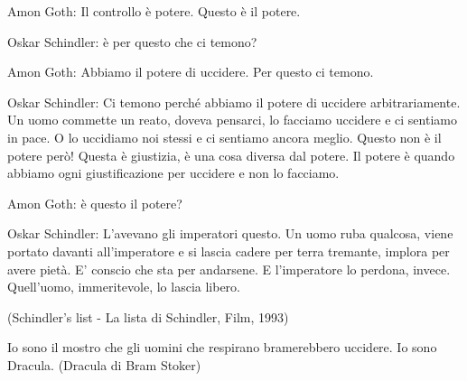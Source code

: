 \bigskip

\begin{changemargin}{0cm}{0.5cm}\begin{enfasi}{

			Amon Goth: Il controllo è potere. Questo è il potere.

			Oskar Schindler: è per questo che ci temono?

			Amon Goth: Abbiamo il potere di uccidere. Per questo ci temono.

			Oskar Schindler: Ci temono perché abbiamo il potere di uccidere arbitrariamente. Un uomo commette un reato, doveva pensarci, lo facciamo uccidere e ci sentiamo in pace. O lo uccidiamo noi stessi e ci sentiamo ancora meglio. Questo non è il potere però! Questa è giustizia, è una cosa diversa dal potere. Il potere è quando abbiamo ogni giustificazione per uccidere e non lo facciamo.

			Amon Goth: è questo il potere?

			Oskar Schindler: L'avevano gli imperatori questo. Un uomo ruba qualcosa, viene portato davanti all'imperatore e si lascia cadere per terra tremante, implora per avere pietà. E' conscio che sta per andarsene. E l'imperatore lo perdona, invece. Quell'uomo, immeritevole, lo lascia libero.

			(Schindler's list - La lista di Schindler, Film, 1993)
}\end{enfasi}\end{changemargin}\medskip


\begin{changemargin}{0cm}{0.5cm}\begin{enfasi}{
			Io sono il mostro che gli uomini che respirano bramerebbero uccidere. Io sono Dracula. (Dracula di Bram Stoker)}\end{enfasi}\end{changemargin}\medskip


\bigskip


